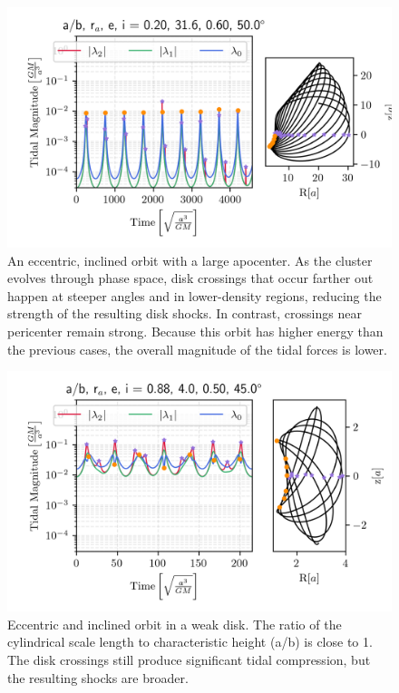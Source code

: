             \begin{figure}
                \includegraphics[width=\linewidth]{images/miyamoto_disc_shocks_ab_rp_e_i_0.20_31.6_0.60_50.0.png}
                \caption{An eccentric, inclined orbit with a large apocenter. As the cluster evolves through phase space, disk crossings that occur farther out happen at steeper angles and in lower-density regions, reducing the strength of the resulting disk shocks. In contrast, crossings near pericenter remain strong. Because this orbit has higher energy than the previous cases, the overall magnitude of the tidal forces is lower. }
                \label{fig:miyamoto_disc_shocks_big_apocenter}
            \end{figure}
            
            \begin{figure}
                \includegraphics[width=\linewidth]{images/miyamoto_disc_shocks_ab_rp_e_i_0.88_4.0_0.50_45.0.png}
                \caption{Eccentric and inclined orbit in a weak disk. The ratio of the cylindrical scale length  to characteristic height (a/b) is close to 1. The disk crossings still produce significant tidal compression, but the resulting shocks are broader.}
                \label{fig:miyamoto_disc_shocks_weak_shocks}
            \end{figure}


